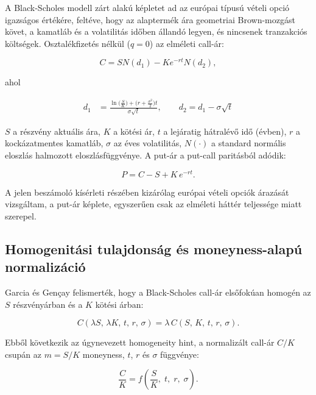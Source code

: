 A Black-Scholes modell \cite{blackscholes1973} zárt alakú képletet ad az európai
típusú vételi opció igazságos értékére, feltéve, hogy az alaptermék ára
geometriai Brown-mozgást követ, a kamatláb és a volatilitás időben állandó legyen,
és nincsenek tranzakciós költségek.
Osztalékfizetés nélkül ($q = 0$) az elméleti call-ár:

\begin{equation}
    C = SN(d_1) - Ke^{-rt}N(d_2), \label{eq:call}
\end{equation}

ahol

\begin{align}
    d_1 &= \frac{\ln\bigl(\frac{S}{K}\bigr) + \bigl(r + \tfrac{\sigma^2}{2}\bigr)t}{\sigma\sqrt{t}},
    \qquad
    d_2 = d_1 - \sigma\sqrt{t} \label{eq:d1d2}
\end{align}

$S$ a részvény aktuális ára, $K$ a kötési ár, $t$ a lejáratig hátralévő idő
(évben), $r$ a kockázatmentes kamatláb, $\sigma$ az éves volatilitás, $N(\cdot)$
a standard normális eloszlás halmozott eloszlásfüggvénye.
A put-ár a put-call paritásból adódik:

\begin{equation}
    P = C - S + K\,e^{-rt}. \label{eq:put}
\end{equation}

A jelen beszámoló kísérleti részében kizárólag európai vételi opciók árazását vizsgáltam, a put-ár képlete, egyszerűen csak az elméleti háttér teljessége miatt szerepel.

\subsection{Homogenitási tulajdonság és moneyness-alapú normalizáció}

Garcia és Gençay \cite{garcia2000} felismerték, hogy a Black-Scholes call-ár
elsőfokúan homogén az $S$ részvényárban és a $K$ kötési árban:

\begin{equation}
    C(\lambda S,\,\lambda K,\,t,\,r,\,\sigma) = \lambda\,C(S,\,K,\,t,\,r,\,\sigma).
\end{equation}

Ebből következik az úgynevezett homogeneity hint, a normalizált call-ár $C/K$
csupán az $m = S/K$ moneyness, $t$, $r$ és $\sigma$ függvénye:

\begin{equation}
    \frac{C}{K} = f\!\left(\frac{S}{K},\;t,\;r,\;\sigma\right). \label{eq:hint}
\end{equation}

